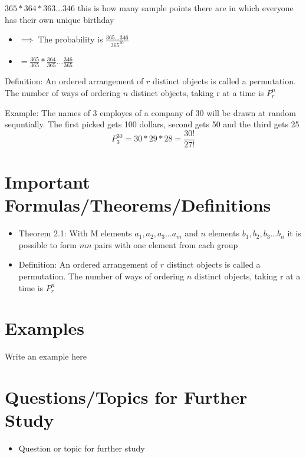\documentclass[12pt,a4paper]{article}
\begin{document}
\( 365 * 364 * 363\ldots 346 \) this is how many sample points there are in which everyone has their own unique birthday 
\begin{itemize}
  \item \( \implies  \) The probability is \( \frac{365\ldots 346}{365^{20}} \)
  \item \( = \frac{365}{365} * \frac{364}{365} \ldots \frac{346}{365} \)
\end{itemize}

Definition: An ordered arrangement of \( r \) distinct objects is called a permutation. The number of ways of ordering \( n \) distinct objects, taking r at a time is \( P^{n}_{r} \)

Example: The names of 3 employes of a company of 30 will be drawn at random sequntially. The first picked gets 100 dollars, second gets 50 and the third gets 25 
\begin{equation}
  P^{30}_{3} = 30 * 29 * 28  = \frac{30!}{27!}
\end{equation}

\section{Important Formulas/Theorems/Definitions}
\begin{tcolorbox}[colback=blue!5!white,colframe=blue!75!black,title=Key Formula/Theorem]
  \begin{itemize}
    \item Theorem 2.1: With M elements \( a_{1},a_{2},a_{3} \ldots a_{m} \) and \( n  \) elements \( b_{1},b_{2},b_{3} \ldots b_{n} \) it is possible to form \( mn  \) pairs with one element from each group 
    \item Definition: An ordered arrangement of \( r \) distinct objects is called a permutation. The number of ways of ordering \( n \) distinct objects, taking r at a time is \( P^{n}_{r} \)
  \end{itemize}
\end{tcolorbox}

\section{Examples}
\begin{tcolorbox}
  Write an example here
\end{tcolorbox}

\section{Questions/Topics for Further Study}
\begin{itemize}
  \item Question or topic for further study
\end{itemize}
\end{document}
